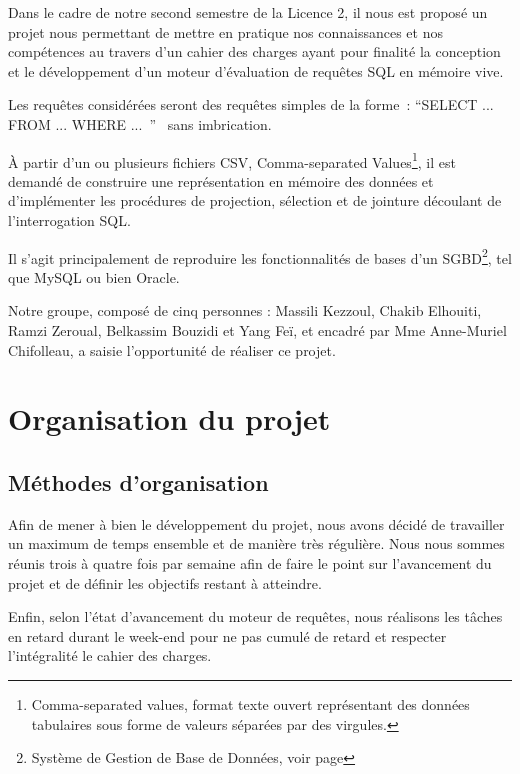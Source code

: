 \documentclass[oneside,13pt,a4paper]{report}
\begin{document}
        Dans le cadre de notre second semestre de la Licence 2, 
        il nous est proposé un projet nous permettant de mettre en pratique nos connaissances et nos compétences 
        au travers d’un cahier des charges ayant pour finalité la conception et le développement d’un moteur d’évaluation de requêtes SQL en mémoire vive.

        Les requêtes considérées seront des requêtes simples de la forme : \enquote{SELECT ... FROM ... WHERE ... }  sans imbrication.

        À partir d’un ou plusieurs fichiers CSV, Comma-separated Values\footnote{Comma-separated values, format texte ouvert représentant des données tabulaires sous forme de valeurs séparées par des virgules.}, 
        il est demandé de construire une représentation en mémoire des données et d’implémenter les procédures de projection, 
        sélection et de jointure découlant de l’interrogation SQL.

        Il s’agit principalement de reproduire les fonctionnalités de bases d’un SGBD\footnote{Système de Gestion de Base de Données, voir page \pageref{sgbd}}, tel que MySQL ou bien Oracle.

        Notre groupe, composé de cinq personnes : Massili Kezzoul, Chakib Elhouiti, Ramzi Zeroual, Belkassim Bouzidi et Yang Feï, et encadré par Mme Anne-Muriel Chifolleau,
        a saisie l'opportunité de réaliser ce projet.

    \chapter{Organisation du projet}
        \section{Méthodes d’organisation}

            Afin de mener à bien le développement du projet, nous avons décidé de travailler un maximum de temps ensemble et de manière très régulière. Nous nous sommes réunis trois à quatre fois par semaine afin de faire le point sur l’avancement du projet et de définir les objectifs restant à atteindre.

            Enfin, selon l’état d’avancement du moteur de requêtes, nous réalisons les tâches en retard durant le week-end pour ne pas cumulé de retard et respecter l’intégralité le cahier des charges.
\end{document}
